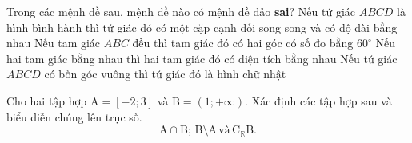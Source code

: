 \begin{ex}%
Trong các mệnh đề sau, mệnh đề nào có mệnh đề đảo {\bf{sai}}?
\choice
{Nếu tứ giác $ ABCD $  là hình bình hành thì tứ giác đó có một cặp cạnh đối song song và có độ dài bằng nhau}
{Nếu tam giác $ ABC $  đều thì tam giác đó có hai góc có số đo bằng $ 60^\circ $ }
{\True Nếu hai tam giác bằng nhau thì hai tam giác đó có diện tích bằng nhau}
{Nếu tứ giác $ ABCD $  có bốn góc vuông thì tứ giác đó là hình chữ nhật}
\end{ex}
\TL
\begin{bt}%
	Cho hai tập hợp $\mathrm{A}=[-2; 3]$ và $\mathrm{B}=(1;+\infty)$. Xác định các tập hợp sau và biểu diễn chúng lên trục số.
	$$
	\mathrm{A} \cap \mathrm{B};\, \mathrm{B} \setminus \mathrm{A}\, \text {và}\, \mathrm{C}_{\mathbb{R}} \mathrm{B}.
	$$
	\loigiai{\begin{multicols}{3}
			\begin{enumerate}[$\bullet$]
				\item $\mathrm{A} \cap \mathrm{B}=(1;3]$;
				\item $\mathrm{B} \setminus \mathrm{A}=(3;+\infty)$;
				\item $\mathrm{C}_{\mathbb{R}} \mathrm{B}=(-\infty;1]$.		
			\end{enumerate}
		\end{multicols}
		}
\end{bt}
